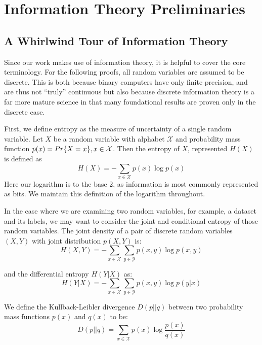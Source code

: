 \chapter{Information Theory Preliminaries}
\label{chap:two}

\section{A Whirlwind Tour of Information Theory} 
Since our work makes use of information theory, it is helpful to cover the core terminology.
For the following proofs, all random variables are assumed to be discrete. 
This is both because binary computers have only finite precision, and are thus not ``truly'' continuous but also because discrete information theory is a far more mature science in that many foundational results are proven only in the discrete case.

First, we define entropy as the measure of uncertainty of a single random variable.
Let $X$ be a random variable with alphabet $\mathcal{X}$ and probability mass function $p(x) = \\Pr\{X = x\}, x \in \mathcal{X}$.
Then the entropy of $X$, represented $H(X)$ is defined as
\begin{equation}\label{eqn: Entropy}
H(X) = -\sum_{x \in \mathcal{X}} p(x) \log{p(x)}	
\end{equation}
Here our logarithm is to the base 2, as information is most commonly represented as bits.
We maintain this definition of the logarithm throughout. 

In the case where we are examining two random variables, for example, a dataset and its labels, we may want to consider the joint and conditional entropy of those random variables.
The joint density of a pair of discrete random variables $(X, Y)$ with joint distribution $p(X, Y)$ is:
\begin{equation}
H(X, Y) = - \sum_{x \in \mathcal{X}} \sum_{y \in \mathcal{Y}} p(x, y) \log{p(x, y)}	
\end{equation}

\noindent and the differential entropy $H(Y | X)$ as:
\begin{equation}\label{eqn: Differential Entropy}
H(Y|X) = -\sum_{x \in \mathcal{X}} \sum_{y \in \mathcal{Y}} p(x, y) \log{p(y|x)}	
\end{equation}


We define the Kullback-Leibler divergence $D(p||q)$ between two probability mass functions $p(x)$ and $q(x)$ to be:
\begin{equation}\label{eqn: KL Divergence}
D(p||q) = \sum_{x \in \mathcal{X}} p(x) \log{\frac{p(x)}{q(x)}}	
\end{equation}

